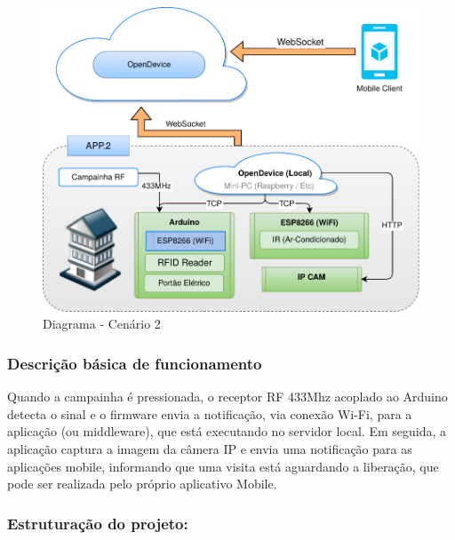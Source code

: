 \begin{figure}[H]
\begin{centering}
\includegraphics[width=1\linewidth]{Imagens/Cap_5/diagrama_caso2}
\par\end{centering}
\caption{Diagrama - Cenário 2 \label{fig:cenario2}}
\end{figure}


\subsubsection*{Descrição básica de funcionamento}

Quando a campainha é pressionada, o receptor RF 433Mhz acoplado ao
Arduino detecta o sinal e o firmware envia a notificação, via conexão
Wi-Fi, para a aplicação (ou middleware), que está executando no servidor
local. Em seguida, a aplicação captura a imagem da câmera IP e envia
uma notificação para as aplicações mobile, informando que uma visita
está aguardando a liberação, que pode ser realizada pelo próprio aplicativo
Mobile. 

\subsubsection*{Estruturação do projeto:}

